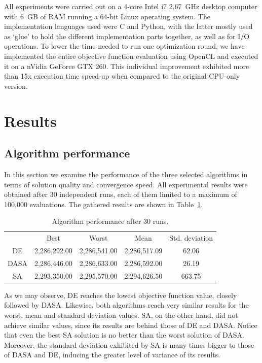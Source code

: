 All experiments were carried out on a 4-core Intel i7 2.67~GHz desktop
computer with 6~GB of RAM running a 64-bit Linux operating system.
The implementation languages used were C and Python, with the latter
mostly used as \textquoteleft{}glue\textquoteright{} to hold the different
implementation parts together, as well as for I/O operations. To lower
the time needed to run one optimization round, we have implemented
the entire objective function evaluation using OpenCL and executed
it on a nVidia GeForce GTX 260. This individual improvement exhibited
more than 15x execution time speed-up when compared to the original
CPU-only version.


\section{Results \label{sec:Results}}


\subsection{Algorithm performance}

In this section we examine the performance of the three selected algorithms
in terms of solution quality and convergence speed. All experimental
results were obtained after 30 independent runs, each of them limited
to a maximum of 100,000 evaluations. The gathered results are shown
in Table~\ref{tab:algorithm_performance}.

\begin{table}
\centering

\caption{Algorithm performance after 30 runs\textit{\emph{.}}\textit{\label{tab:algorithm_performance}}}


\begin{tabular}{ccccc}
\toprule 
 & Best & Worst & Mean & Std. deviation\tabularnewline\addlinespace
\midrule
DE & 2,286,292.00 & 2,286,541.00 & 2,286,517.09 & 62.06\tabularnewline
DASA & 2,286,446.00 & 2,286,633.00 & 2,286,592.00 & 26.19\tabularnewline
SA  & 2,293,350.00 & 2,295,570.00 & 2,294,626.50 & 663.75\tabularnewline
\bottomrule
\end{tabular}
\end{table}




As we may observe, DE reaches the lowest objective function value,
closely followed by DASA. Likewise, both algorithms reach very similar
results for the worst, mean and standard deviation values. SA, on
the other hand, did not achieve similar values, since its results
are behind those of DE and DASA. Notice that even the best SA solution
is no better than the worst solution of DASA. Moreover, the standard
deviation exhibited by SA is many times bigger to those of DASA and
DE, inducing the greater level of variance of its results.

